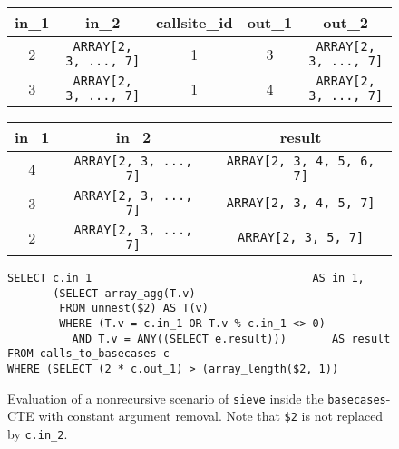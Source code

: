 \begin{figure}[h]
    \centering\footnotesize
    \begin{minipage}[b]{\linewidth}
    \centering
    \begin{tabular}{c|c|c|c|c}
         in\_1 & in\_2                                     & callsite\_id & out\_1 & out\_2                                  \\\hline
         2     & \texttt{ARRAY[2, 3, ..., 7]} & 1            & 3      & \texttt{ARRAY[2, 3, ..., 7]}\\
         3     & \texttt{ARRAY[2, 3, ..., 7]} & 1            & 4      & \texttt{ARRAY[2, 3, ..., 7]}\\
    \end{tabular}
    \label{}
    \end{minipage}\par
    \vspace*{15mm}
    \begin{minipage}[b]{\linewidth}
    \centering
    \begin{tabular}{c|c|c}
         in\_1 & in\_2                                     & result                                  \\\hline
         4     & \texttt{ARRAY[2, 3, ..., 7]} & \texttt{ARRAY[2, 3, 4, 5, 6, 7]}\\
         3     & \texttt{ARRAY[2, 3, ..., 7]} & \texttt{ARRAY[2, 3, 4, 5, 7]}\\
         2     & \texttt{ARRAY[2, 3, ..., 7]} & \texttt{ARRAY[2, 3, 5, 7]}\\
    \end{tabular}
    \label{}
    \end{minipage}
    \caption{}
    \label{}
\end{figure}

\begin{figure}[h]
    \centering
    \begin{verbatim}
SELECT c.in_1                                  AS in_1, 
       (SELECT array_agg(T.v)
        FROM unnest($2) AS T(v)
        WHERE (T.v = c.in_1 OR T.v % c.in_1 <> 0)
          AND T.v = ANY((SELECT e.result)))       AS result
FROM calls_to_basecases c
WHERE (SELECT (2 * c.out_1) > (array_length($2, 1))
    \end{verbatim}
    \caption{Evaluation of a nonrecursive scenario of \texttt{sieve} inside the \texttt{basecases}-CTE with constant argument removal. Note that \texttt{\$2} is not replaced by \texttt{c.in\_2}.}
    \label{fig:my_label}
\end{figure}

